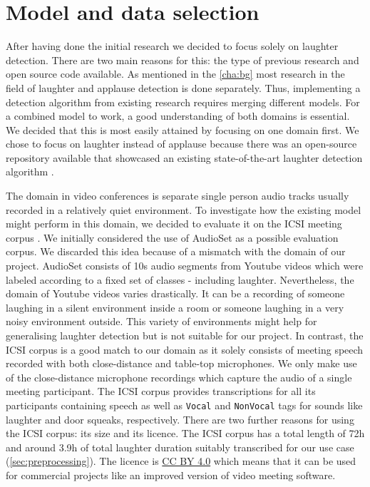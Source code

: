 \documentclass[bsc,frontabs,parskip,deptreport]{infthesis}
\begin{document}
\section{Model and data selection}\label{sec:model-and-data}
After having done the initial research we decided to focus solely on laughter detection. 
There are two main reasons for this: the type of previous research and open source code available.  
As mentioned in the \autoref{cha:bg} most research in the field of laughter and applause detection is done separately. 
Thus, implementing a detection algorithm from existing research requires merging different models. 
For a combined model to work, a good understanding of both domains is essential.
We decided that this is most easily attained by focusing on one domain first. 
We chose to focus on laughter instead of applause because there was an open-source repository available that showcased an existing state-of-the-art laughter detection algorithm \citep{gillick-codebase, gillick2021robust}.

The domain in video conferences is separate single person audio tracks usually recorded in a relatively quiet environment.
To investigate how the existing model might perform in this domain, we decided to evaluate it on the ICSI meeting corpus \citep{morgan2001meeting}. 
We initially considered the use of AudioSet \citep{googleaudioset} as a possible evaluation corpus. We discarded this idea because of a mismatch with the domain of our project. AudioSet  consists of 10s audio segments from Youtube videos which were labeled according to a fixed set of classes - including laughter. Nevertheless, the domain of Youtube videos varies drastically. It can be a recording of someone laughing in a silent environment inside a room or someone laughing in a very noisy environment outside. This variety of environments might help for generalising laughter detection but is not suitable for our project.
In contrast, the ICSI corpus is a good match to our domain as it solely consists of meeting speech recorded with both close-distance and table-top microphones. 
We only make use of the close-distance microphone recordings which capture the audio of a single meeting participant.
The ICSI corpus provides transcriptions for all its participants containing speech as well as \texttt{Vocal} and \texttt{NonVocal} tags for sounds like laughter and door squeaks, respectively.
There are two further reasons for using the ICSI corpus: its size and its licence.
The ICSI corpus has a total length of 72h and around 3.9h of total laughter duration suitably transcribed for our use case (\autoref{sec:preprocessing}).
The licence is \href{https://creativecommons.org/licenses/by/4.0/legalcode}{CC BY 4.0} which means that it can be used for commercial projects like an improved version of video meeting software. 
\end{document}
